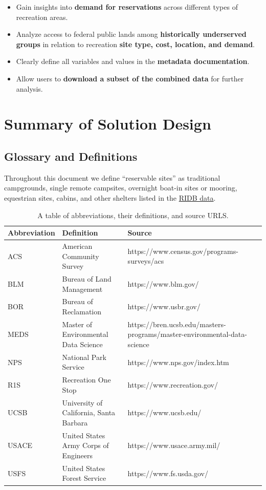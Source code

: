 \documentclass[
]{book}
\providecommand{\tightlist}{%
  \setlength{\itemsep}{0pt}\setlength{\parskip}{0pt}}
\begin{document}
\begin{itemize}
\tightlist
\item
  Gain insights into \textbf{demand for reservations} across different types of recreation areas.
\item
  Analyze access to federal public lands among \textbf{historically underserved groups} in
  relation to recreation \textbf{site type, cost, location, and demand}.
\item
  Clearly define all variables and values in the \textbf{metadata documentation}.
\item
  Allow users to \textbf{download a subset of the combined data} for further analysis.
\end{itemize}

\hypertarget{summary-of-solution-design}{%
\chapter{Summary of Solution Design}\label{summary-of-solution-design}}

\hypertarget{glossary-and-definitions}{%
\section{Glossary and Definitions}\label{glossary-and-definitions}}

Throughout this document we define ``reservable sites'' as traditional campgrounds, single remote campsites, overnight boat-in sites or mooring, equestrian sites, cabins, and other shelters listed in the \href{https://ridb.recreation.gov/}{RIDB data}.

\begin{table}

\caption{\label{tab:glossary-table}A table of abbreviations, their definitions, and source URLS.}
\centering
\begin{tabular}[t]{l|l|l}
\hline
Abbreviation & Definition & Source\\
\hline
ACS & American Community Survey & https://www.census.gov/programs-surveys/acs\\
\hline
BLM & Bureau of Land Management & https://www.blm.gov/\\
\hline
BOR & Bureau of Reclamation & https://www.usbr.gov/\\
\hline
MEDS & Master of Environmental Data Science & https://bren.ucsb.edu/masters-programs/master-environmental-data-science\\
\hline
NPS & National Park Service & https://www.nps.gov/index.htm\\
\hline
R1S & Recreation One Stop & https://www.recreation.gov/\\
\hline
UCSB & University of California, Santa Barbara & https://www.ucsb.edu/\\
\hline
USACE & United States Army Corps of Engineers & https://www.usace.army.mil/\\
\hline
USFS & United States Forest Service & https://www.fs.usda.gov/\\
\hline
\end{tabular}
\end{table}
\end{document}
